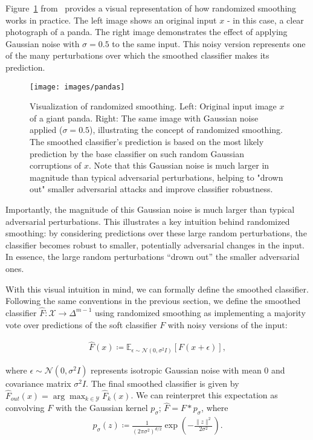 Figure~\ref{fig:pandas} from~\citep{cohen2019certified} provides a visual representation of how randomized smoothing works in practice.
The left image shows an original input $x$ - in this case, a clear photograph of a panda.
The right image demonstrates the effect of applying Gaussian noise with $\sigma = 0.5$ to the same input.
This noisy version represents one of the many perturbations over which the smoothed classifier makes its prediction.
\begin{figure}[htbp]
    \centering
    \texttt{[image: images/pandas]}
    \caption{Visualization of randomized smoothing. Left: Original input image $x$ of a giant panda. Right: The same image with Gaussian noise applied ($\sigma = 0.5$), illustrating the concept of randomized smoothing. The smoothed classifier's prediction is based on the most likely prediction by the base classifier on such random Gaussian corruptions of $x$. Note that this Gaussian noise is much larger in magnitude than typical adversarial perturbations, helping to "drown out" smaller adversarial attacks and improve classifier robustness.}
    \label{fig:pandas}
\end{figure}

Importantly, the magnitude of this Gaussian noise is much larger than typical adversarial perturbations.
This illustrates a key intuition behind randomized smoothing: by considering predictions over these large random perturbations, the classifier becomes robust to smaller, potentially adversarial changes in the input.
In essence, the large random perturbations ``drown out'' the smaller adversarial ones.

With this visual intuition in mind, we can formally define the smoothed classifier.
Following the same conventions in the previous section, we define the smoothed classifier $\hat{F}: \mathcal{X} \rightarrow \Delta^{m-1}$ using randomized smoothing as implementing a majority vote over predictions of the soft classifier $F$ with noisy versions of the input:

\begin{align*}
    \hat{F}(x) \coloneqq \mathbb{E}_{\epsilon \sim \mathcal{N}(0, \sigma^2 I)} [F(x + \epsilon)],
\end{align*}

where $\epsilon \sim \mathcal{N}(0, \sigma^2 I)$ represents isotropic Gaussian noise with mean $0$ and covariance matrix $\sigma^2 I$.
The final smoothed classifier is given by $\hat{F}_{out}(x) = \arg\max_{k \in \mathcal{Y}} \hat{F}_k(x)$.
We can reinterpret this expectation as convolving $F$ with the Gaussian kernel $p_\sigma$; $\hat{F} = F * p_\sigma$, where
\begin{align*}
    p_\sigma(z) \coloneqq \frac{1}{(2\pi\sigma^2)^{d/2}} \exp\left(-\frac{\|z\|^2}{2\sigma^2}\right).
\end{align*}


